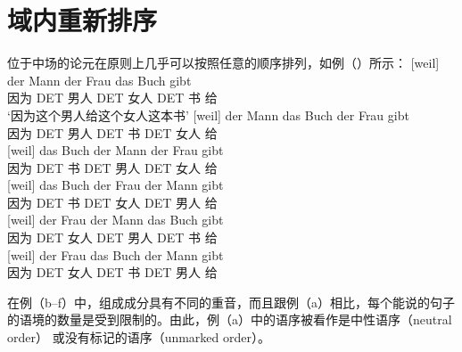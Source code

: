 \section{域内重新排序}
\label{sec-GB-lokale-Umstellung}

位于中场的论元在原则上几乎可以按照任意的顺序排列，如例（）所示：
\eal
\label{ex-gb-umstellung}
\ex 
\gll {}[weil] der Mann der Frau das Buch gibt\\
     \spacebr{}因为 DET 男人 DET 女人 DET 书 给\\
\glt `因为这个男人给这个女人这本书'
\ex 
\gll {}[weil] der Mann das Buch der Frau gibt\\
     \spacebr{}因为 DET 男人 DET 书 DET 女人 给\\
\ex\label{ex-das-buch-der-mann-der-frau-gibt} 
\gll {}[weil] das Buch der Mann der Frau gibt\\
     \spacebr{}因为 DET 书 DET 男人 DET 女人 给\\
\ex 
\gll {}[weil] das Buch der Frau der Mann gibt\\
     \spacebr{}因为 DET 书 DET 女人 DET 男人 给\\
\ex 
\gll {}[weil] der Frau der Mann das Buch gibt\\
     \spacebr{}因为 DET 女人 DET 男人 DET 书 给\\
\ex 
\gll {}[weil] der Frau das Buch der Mann gibt\\
     \spacebr{}因为 DET 女人 DET 书 DET 男人 给\\
\zl

\noindent
在例（b--f）中，组成成分具有不同的重音，而且跟例（a）相比，每个能说的句子的语境的数量是受到限制的\citep{Hoehle82}。由此，例（a）中的语序被看作是中性语序（neutral order） 或没有标记的语序（unmarked order）。

